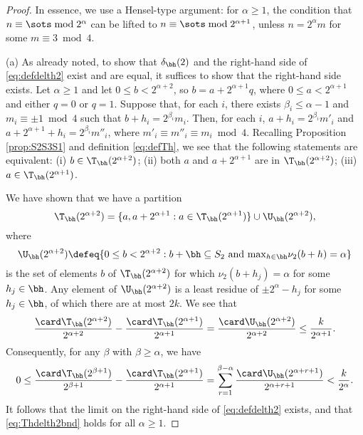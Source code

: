 \documentclass[12pt, reqno, twoside, letterpaper]{amsart}
\begin{document}
\begin{proof}
%
In essence, we use a Hensel-type argument: for $\alpha \ge 1$, the 
condition that $n \equiv \sots \bmod 2^{\alpha}$ can be lifted
to $n \equiv \sots \bmod 2^{\alpha + 1}$, unless $n = 2^{\alpha}m$
for some $m \equiv 3 \bmod 4$.

(a)
%
As already noted, to show that $\delta_{\bh}(2)$ and the 
right-hand side of \eqref{eq:defdelth2} exist and are equal, it 
suffices to show that the right-hand side exists.
%
Let $\alpha \ge 1$ and let $0 \le b < 2^{\alpha + 2}$, so 
$b = a + 2^{\alpha + 1}q$, where 
$0 \le a < 2^{\alpha + 1}$ and either $q = 0$ or $q = 1$.
%
Suppose that, for each $i$, there exists $\beta_i \le \alpha - 1$ 
and $m_i \equiv \pm 1 \bmod 4$ such that 
$b + h_i = 2^{\beta_i}m_i$.
%
Then, for each $i$, $a + h_i = 2^{\beta_i}m'_i$ 
and $a + 2^{\alpha + 1} + h_i = 2^{\beta_i}m''_i$, where 
$m'_i \equiv m''_i \equiv m_i \bmod 4$.
%
Recalling Proposition \ref{prop:S2S3S1} and definition 
\eqref{eq:defTh}, we see that the following statements are 
equivalent: 
(i) $b \in \T_{\bh}(2^{\alpha + 2})$; 
(ii) both $a$ and $a + 2^{\alpha + 1}$ are in 
$\T_{\bh}(2^{\alpha + 2})$;
(iii) $a \in \T_{\bh}(2^{\alpha + 1})$.

We have shown that we have a partition 
\[
 \T_{\bh}(2^{\alpha + 2})
  =
   \{a,a + 2^{\alpha + 1} : a \in \T_{\bh}(2^{\alpha + 1})\}
    \cup
     \U_{\bh}(2^{\alpha + 2}),
\]
where 
\[
 \U_{\bh}(2^{\alpha + 2}) 
  \defeq 
   \{0 \le b < 2^{\alpha + 2} : b + \bh \subseteq S_2 
        \,\, \hbox{\textup{and}} \,\, 
         {\textstyle \max_{h \in\bh} } \nu_2(b + h) = \alpha\}  
\]
is the set of elements $b$ of $\T_{\bh}(2^{\alpha + 2})$ for which 
$\nu_2(b + h_j) = \alpha$ for some $h_j \in \bh$.
%
Any element of $\U_{\bh}(2^{\alpha + 2})$ is a least
residue of 
$\pm 2^{\alpha} - h_j$ for some $h_j \in \bh$, of which there are 
at most $2k$.
%
We see that 
\[
   \frac{\card \T_{\bh}(2^{\alpha + 2})}{2^{\alpha + 2}}
  -
    \frac{\card \T_{\bh}(2^{\alpha + 1})}{2^{\alpha + 1}}
   =
      \frac{\card \U_{\bh}(2^{\alpha + 2})}{2^{\alpha + 2}}
       \le 
        \frac{k}{2^{\alpha + 1}}.
\]
%
Consequently, for any $\beta$ with $\beta \ge \alpha$, we have 
\[
 0
  \le 
   \frac{\card \T_{\bh}(2^{\beta + 1})}{2^{\beta + 1}}
  -
    \frac{\card \T_{\bh}(2^{\alpha + 1})}{2^{\alpha + 1}}
     =
      \sum_{r = 1}^{\beta - \alpha}
       \frac{\card \U_{\bh}(2^{\alpha + r + 1})}{2^{\alpha + r + 1}}
        <
         \frac{k}{2^{\alpha}}.
\]
%
It follows that the limit on the right-hand side of 
\eqref{eq:defdelth2} exists, and that \eqref{eq:Thdelth2bnd} holds 
for all $\alpha \ge 1$.


\end{proof}
\end{document}
